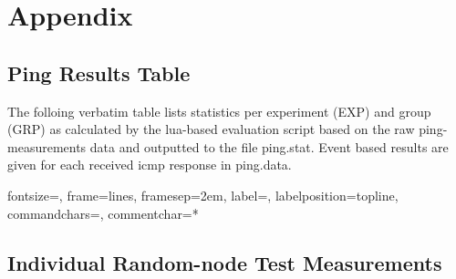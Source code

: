 \documentclass[a4paper,12pt,twoside]{article}
\begin{document}
\section{Appendix}

\subsection{Ping Results Table}

The folloing verbatim table lists statistics per experiment (EXP) and group (GRP) as calculated by the lua-based
evaluation script based on the raw ping-measurements data and outputted to the file ping.stat.
Event based results are given for each received icmp response in ping.data.

{}%
{fontsize=\tiny,
 frame=lines,  %
 framesep=2em, %
 label=,
 labelposition=topline,
 commandchars=\|\(\), %
 commentchar=*        %
}


\subsection{Individual Random-node Test Measurements}

 {%
}

 {%
}

 {%
}

 {%
}
\end{document}
